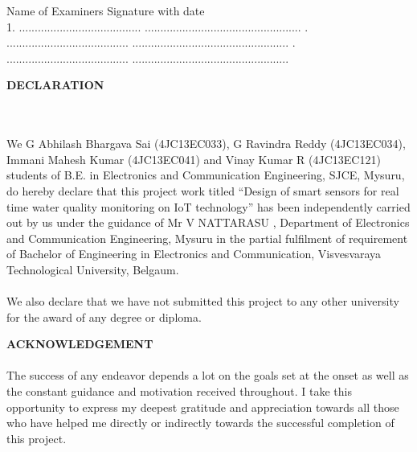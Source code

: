 \documentclass[12pt]{extarticle}
\numberwithin{figure}{section}
\begin{document}
Name of Examiners\hspace{80mm}	Signature with date\\
1. ....................................... \hspace{65mm}	..................................................
. ....................................... \hspace{65mm}	..................................................
. ....................................... \hspace{65mm}	..................................................


\newpage
\thispagestyle{empty}

\begin{center}
\begin{large}
\textbf{DECLARATION}
\end{large}
\end{center}
\ \\
\paragraph{}
We G Abhilash Bhargava Sai (4JC13EC033), G Ravindra Reddy (4JC13EC034), Immani Mahesh Kumar (4JC13EC041) and Vinay Kumar R (4JC13EC121) students of B.E. in Electronics and Communication Engineering, SJCE, Mysuru, do hereby declare that this project work titled “Design of smart sensors for real time water quality monitoring on IoT technology” has been independently carried out by us under the guidance of Mr V NATTARASU , Department of Electronics and Communication Engineering, Mysuru in the partial fulﬁlment of requirement of Bachelor of Engineering in Electronics and Communication, Visvesvaraya Technological University, Belgaum.
\ \\
\paragraph{}
We also declare that we have not submitted this project to any other university for the award of any degree or diploma.
\ \\
\newpage
\thispagestyle{empty}

\begin{center}
\begin{large}
\textbf{ACKNOWLEDGEMENT}
\end{large}
\end{center}
\paragraph{}
The success of any endeavor depends a lot on the goals set at the onset as well as the constant guidance and motivation received throughout. I take this opportunity to express my deepest gratitude and appreciation towards all those who have helped me directly or indirectly towards the successful completion of this project.
\end{document}
